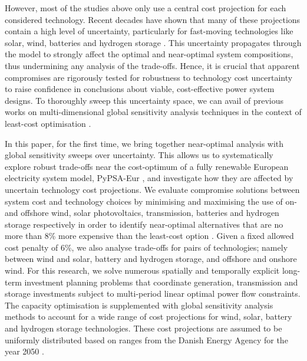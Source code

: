 However, most of the studies above only use a central cost projection for each
considered technology. Recent decades have shown that many of these
projections contain a high level of uncertainty, particularly for fast-moving
technologies like solar, wind, batteries and hydrogen storage
\cite{ludererImpactDeclining2021,victoriaSolarPhotovoltaics2021,jaxa-rozenSourcesUncertainty2021}. This
uncertainty propagates through the model to strongly affect the optimal and
near-optimal system compositions, thus undermining any analysis of the
trade-offs. Hence, it is crucial that apparent compromises are rigorously tested
for robustness to technology cost uncertainty to raise confidence in conclusions
about viable, cost-effective power system designs. To thoroughly sweep this
uncertainty space, we can avail of previous works on
multi-dimensional global sensitivity analysis techniques in the context of
least-cost optimisation \cite{trondle_trade-offs_2020,
mavromatidis_uncertainty_2018, pizarro-alonso_uncertainties_2019,
fais_impact_2016, usher_value_2015}.


In this paper, for the first time, we bring together near-optimal analysis with
global sensitivity sweeps over uncertainty. This allows us to systematically
explore robust trade-offs near the cost-optimum of a fully renewable European
electricity system model, PyPSA-Eur \cite{pypsaeur}, and investigate how they
are affected by uncertain technology cost projections. We evaluate compromise
solutions between system cost and technology choices by minimising and
maximising the use of on- and offshore wind, solar photovoltaics, transmission,
batteries and hydrogen storage respectively in order to identify near-optimal
alternatives that are no more than 8\% more expensive than the least-cost
option . Given a fixed allowed cost penalty of 6\%, we also analyse trade-offs
for pairs of technologies; namely between wind and solar, battery and hydrogen
storage, and offshore and onshore wind. For this research, we solve numerous
spatially and temporally explicit long-term investment planning problems that
coordinate generation, transmission and storage investments subject to
multi-period linear optimal power flow constraints. The capacity optimisation is
supplemented with global sensitivity analysis methods to account for a wide
range of cost projections for wind, solar, battery and hydrogen storage
technologies. These cost projections are assumed to be uniformly distributed
based on ranges from the Danish Energy Agency for the year 2050 \cite{DEA}.

